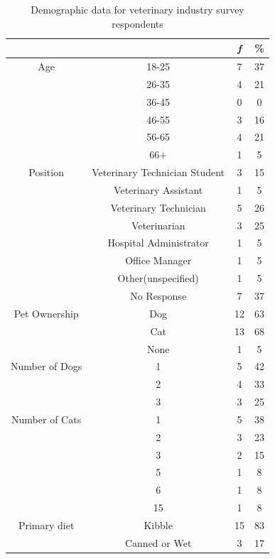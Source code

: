 \begin{table}[htbp]
    \centering
    \caption{Demographic data for veterinary industry survey respondents}
    \label{tab:my_label}
    \begin{tabular}{c|c|cc}
    \hline
        &      &  \textit{f} & \% \\ \hline
    Age &  18-25   &  7 &   37  \\
        &  26-35   &  4 &   21  \\
        &  36-45   &  0 &   0   \\
        &  46-55    & 3 &   16  \\
        &  56-65    & 4 &   21  \\
        &   66+    &  1 &   5   \\  \hline
Position &  Veterinary Technician Student   &   3   &   15  \\
        &   Veterinary Assistant    &   1   &   5   \\
        &   Veterinary Technician   &   5   &   26  \\
        &   Veterinarian    &   3   &   25  \\
        &   Hospital Administrator  &   1   &   5   \\
        &   Office Manager  &   1   &   5   \\
        &   Other(unspecified)  &   1   &   5   \\
        &   No Response &   7   &   37  \\  \hline
Pet Ownership   &   Dog &   12  &   63  \\
        &   Cat &   13  &   68  \\
        &   None    &   1   &   5   \\  \hline
Number of Dogs     &   1   &   5   &   42  \\
        &   2   &   4   &   33  \\
        &   3   &   3   &   25  \\  \hline
Number of Cats     &   1   &   5   &   38  \\
        &   2   &   3   &   23  \\
        &   3   &   2   &   15  \\
        &   5   &   1   &   8   \\
        &   6   &   1   &   8   \\
        &   15  &   1   &   8   \\ \hline
Primary diet    &   Kibble  &   15  &   83  \\
        &   Canned or Wet   &   3   &   17  \\

\end{tabular}
\end{table}
